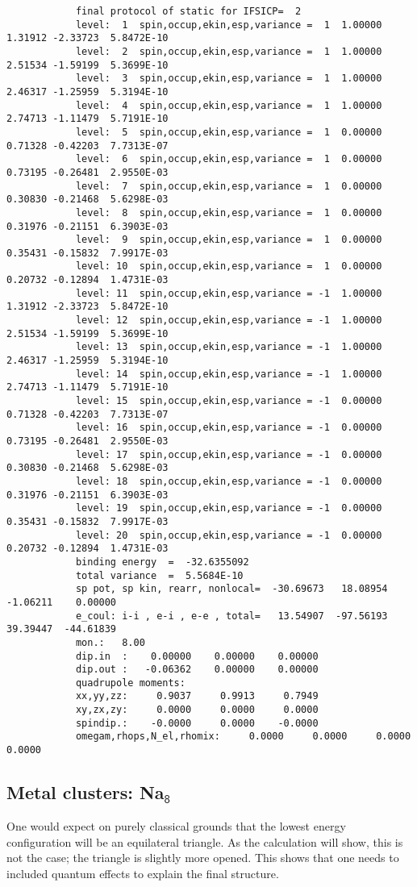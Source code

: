 \documentclass[11pt,a4paper]{article}
\begin{document}
		\begin{verbatim}
			final protocol of static for IFSICP=  2
			level:  1  spin,occup,ekin,esp,variance =  1  1.00000  1.31912 -2.33723  5.8472E-10
			level:  2  spin,occup,ekin,esp,variance =  1  1.00000  2.51534 -1.59199  5.3699E-10
			level:  3  spin,occup,ekin,esp,variance =  1  1.00000  2.46317 -1.25959  5.3194E-10
			level:  4  spin,occup,ekin,esp,variance =  1  1.00000  2.74713 -1.11479  5.7191E-10
			level:  5  spin,occup,ekin,esp,variance =  1  0.00000  0.71328 -0.42203  7.7313E-07
			level:  6  spin,occup,ekin,esp,variance =  1  0.00000  0.73195 -0.26481  2.9550E-03
			level:  7  spin,occup,ekin,esp,variance =  1  0.00000  0.30830 -0.21468  5.6298E-03
			level:  8  spin,occup,ekin,esp,variance =  1  0.00000  0.31976 -0.21151  6.3903E-03
			level:  9  spin,occup,ekin,esp,variance =  1  0.00000  0.35431 -0.15832  7.9917E-03
			level: 10  spin,occup,ekin,esp,variance =  1  0.00000  0.20732 -0.12894  1.4731E-03
			level: 11  spin,occup,ekin,esp,variance = -1  1.00000  1.31912 -2.33723  5.8472E-10
			level: 12  spin,occup,ekin,esp,variance = -1  1.00000  2.51534 -1.59199  5.3699E-10
			level: 13  spin,occup,ekin,esp,variance = -1  1.00000  2.46317 -1.25959  5.3194E-10
			level: 14  spin,occup,ekin,esp,variance = -1  1.00000  2.74713 -1.11479  5.7191E-10
			level: 15  spin,occup,ekin,esp,variance = -1  0.00000  0.71328 -0.42203  7.7313E-07
			level: 16  spin,occup,ekin,esp,variance = -1  0.00000  0.73195 -0.26481  2.9550E-03
			level: 17  spin,occup,ekin,esp,variance = -1  0.00000  0.30830 -0.21468  5.6298E-03
			level: 18  spin,occup,ekin,esp,variance = -1  0.00000  0.31976 -0.21151  6.3903E-03
			level: 19  spin,occup,ekin,esp,variance = -1  0.00000  0.35431 -0.15832  7.9917E-03
			level: 20  spin,occup,ekin,esp,variance = -1  0.00000  0.20732 -0.12894  1.4731E-03
			binding energy  =  -32.6355092
			total variance  =  5.5684E-10
			sp pot, sp kin, rearr, nonlocal=  -30.69673   18.08954   -1.06211    0.00000
			e_coul: i-i , e-i , e-e , total=   13.54907  -97.56193   39.39447  -44.61839
			mon.:   8.00
			dip.in  :    0.00000    0.00000    0.00000
			dip.out :   -0.06362    0.00000    0.00000
			quadrupole moments:
			xx,yy,zz:     0.9037     0.9913     0.7949
			xy,zx,zy:     0.0000     0.0000     0.0000
			spindip.:    -0.0000     0.0000    -0.0000
			omegam,rhops,N_el,rhomix:     0.0000     0.0000     0.0000     0.0000
		\end{verbatim}
		
		\subsection{Metal clusters: Na$_\mathsf{8}$}
			One would expect on purely classical grounds that the lowest energy configuration will be an equilateral triangle. As the calculation will show, this is not the case; the triangle is slightly more opened. This shows that one needs to included  quantum effects to explain the final structure.
			
\end{document}
